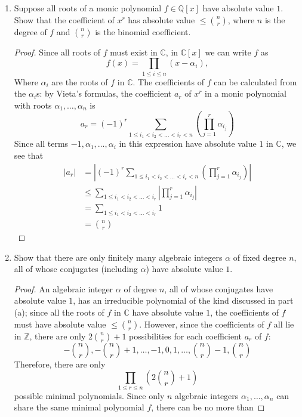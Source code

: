 \documentclass[12pt]{article}
\newcommand{\Q}{\mathbb{Q}}
\newcommand{\Z}{\mathbb{Z}}
\newcommand{\C}{\mathbb{C}}
\theoremstyle{definition}
\newenvironment{problem}[2][Problem]{\begin{trivlist}
\item[\hskip \labelsep {\bfseries #1}\hskip \labelsep {\bfseries #2.}]}{\end{trivlist}}
\begin{document}
\begin{problem}{11}
	\begin{enumerate}[label=(\alph*)]
		\item Suppose all roots of a monic polynomial $f \in \Q[x]$ have absolute value $1$. Show that the coefficient of $x^r$ has absolute value $\leq \binom{n}{r}$, where $n$ is the degree of $f$ and $\binom{n}{r}$ is the binomial coefficient.
			\begin{proof}
				Since all roots of $f$ must exist in $\C$, in $\C[x]$ we can write $f$ as
				\[f(x) = \prod_{1 \leq i \leq n} (x - \alpha_i),\]
				Where $\alpha_i$ are the roots of $f$ in $\C$. The coefficients of $f$ can be calculated from the $\alpha_i$s: by Vieta's formulas, the coefficient $a_r$ of $x^r$ in a monic polynomial with roots $\alpha_1, \dots , \alpha_n$ is 
				\[a_r = (-1)^{r}\sum_{1 \leq i_1 < i_2 < \dots < i_r < n} \left( \prod_{j = 1}^r \alpha_{i_j} \right)\]
				Since all terms $-1, \alpha_1, \dots , \alpha_i$ in this expression have absolute value $1$ in $\C$, we see that
				\begin{align*}
					\left \lvert { a_r } \right \lvert &= \left \lvert { (-1)^r \sum_{1 \leq i_1 < i_2 < \dots < i_r < n} \left( \prod_{j = 1}^r \alpha_{i_j} \right) } \right \lvert \\
					&\leq \sum_{1 \leq i_1 < i_2 < \dots < i_r} \left \lvert {  \prod_{j = 1}^r \alpha_{i_j}} \right \lvert \\
					&= \sum_{1 \leq i_1 < i_2 < \dots < i_r} 1\\
					&= \binom{n}{r}
				\end{align*}
			\end{proof}
		\item Show that there are only finitely many algebraic integers $\alpha$ of fixed degree $n$, all of whose conjugates (including $\alpha$) have absolute value $1$.
			\begin{proof}
			An algebraic integer $\alpha$ of degree $n$, all of whose conjugates have absolute value $1$, has an irreducible polynomial of the kind discussed in part (a); since all the roots of $f$ in $\C$ have absolute value $1$, the coefficients of $f$ must have absolute value $\leq \binom{n}{r}$. However, since the coefficients of $f$ all lie in $\Z$, there are only $2\binom{n}{r} + 1$ possibilities for each coefficient $a_r$ of $f$:
			\[ - \binom{n}{r}, - \binom{n}{r} + 1, \dots , -1, 0, 1, \dots , \binom{n}{r} - 1, \binom{n}{r}\]
			Therefore, there are only 
			\[\prod_{1 \leq r \leq n} \left( 2 \binom{n}{r} + 1 \right)\]
			possible minimal polynomials. Since only $n$ algebraic integers $\alpha_1, \dots , \alpha_n$ can share the same minimal polynomial $f$, there can be no more than 

\end{proof}
\end{enumerate}
\end{problem}
\end{document}
